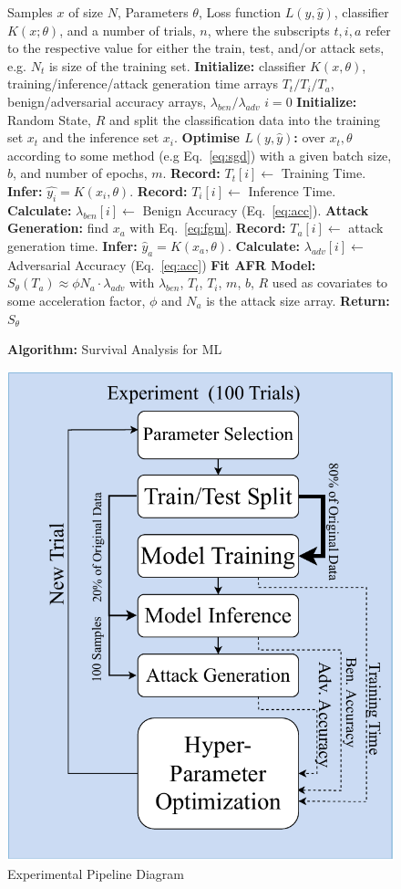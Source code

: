 \documentclass[conference]{IEEEtran}
\begin{document}
\begin{figure}[h!]
    \caption{\textbf{Algorithm: }Survival Analysis for ML}
    \label{fig:alg}
\begin{algorithmic}
    \Require Samples $x$ of size $N$, Parameters $\theta$, Loss function $L(y, \hat{y})$, classifier $K(x; \theta)$, and a number of trials, $n$, where the subscripts $t,i,a$ refer to the respective value for either the train, test, and/or attack sets, e.g. $N_t$ is size of the training set.
    \State \textbf{Initialize:} classifier $K(x, \theta)$, training/inference/attack generation time arrays $T_t/T_i/T_a$, benign/adversarial accuracy arrays, $\lambda_{ben}/ \lambda_{adv}$
    \State $i = 0$
    \State \textbf{Initialize:} Random State, $R$ and split the classification data into the training set $x_t$ and the inference set $x_i$.
    \State \textbf{Optimise $L(y, \hat{y})$:} over $x_t, \theta$ according to some method (e.g Eq.~\ref{eq:sgd}) with a given batch size, $b$, and number of epochs, $m$.
    \State \textbf{Record:} $T_t[i] \gets$ Training Time.
    \State \textbf{Infer:}  $ \hat{y_i} = K(x_i, \theta) $.
    \State \textbf{Record:}  $ T_i[i] \gets $  Inference Time.
    \State \textbf{Calculate:}  $\lambda_{ben}[i] \gets $  Benign Accuracy (Eq.~\ref{eq:acc}).
    \State \textbf{Attack Generation: } find $x_a$ with Eq.~\ref{eq:fgm}.
    \State \textbf{Record:} $T_a[i] \gets$ attack generation time.
    \State \textbf{Infer:}  $ \hat{y}_a = K(x_a, \theta) $.
    \State \textbf{Calculate:}  $\lambda_{adv}[i] \gets $  Adversarial Accuracy (Eq.~\ref{eq:acc})
    \EndWhile
    \State \textbf{Fit AFR Model:} $S_{\theta}(T_a) \approx \phi N_a \cdot \lambda_{adv}$ with $\lambda_{ben}$, $T_t$, $T_i$, $m$, $b$, $R$ used as covariates to some acceleration factor, $\phi$ and  $N_a$ is the attack size array.
    \State \textbf{Return:} $S_{\theta}$
\end{algorithmic}
\end{figure}


\begin{figure}
    \centering
    \includegraphics[width=.35\textwidth]{plots/experiment.pdf}
    \caption{Experimental Pipeline Diagram}
    \label{fig:experiments}
\end{figure}
\end{document}
